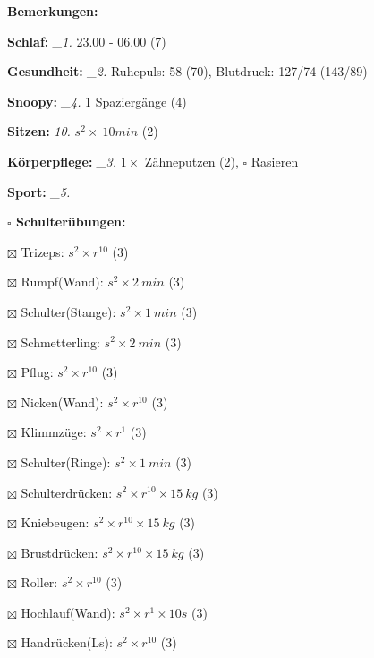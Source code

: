 \documentclass[10pt,a4paper]{article}
\newcommand\prop[1] {{\color {alizarin} {\bf #1}}}             %
\newcommand\mand[1] {{\color {burntorange} {\bf #1}}}          %
\newcommand\topspace{\vskip -15pt \hskip 20pt}
\newcommand\n[1] { {\sl #1.} \hskip 5pt }
\begin{document}
\begin{mdframed}[style=daystyle]
  \begin{labeling}{{\mand {Bemerkungen:}}}
    \setlength\itemsep{-3pt}
  \item[{\mand {Schlaf:}}]        \n{\_1} 23.00 - 06.00 (7)
  \item[{\mand {Gesundheit:}}]    \n{\_2} Ruhepuls: 58 (70), Blutdruck: 127/74 (143/89)
  \item[{\mand {Snoopy:}}]        \n{\_4} 1 Spaziergänge (4)  
  \item[{\mand {Sitzen:}}]         \n{10} $s^2 \times\ 10 min$ (2)
  \item[{\mand {Körperpflege:}}]  \n{\_3} $1 \times$ Zähneputzen (2), $\square$ Rasieren
  \item[{\mand {Sport:}}]         \n{\_5}
    \topspace
    \begin{minipage}{0.75\textwidth}  
      \begin{labeling}{\prop {$\square$ {Schulterübungen:}}} 
        \setlength\itemsep{-3pt}
      \item[$\boxtimes$ Trizeps:]          $s^2 \times r^{10}$ (3)
      \item[$\boxtimes$ Rumpf(Wand):]      $s^2 \times 2\ min$ (3)
      \item[$\boxtimes$ Schulter(Stange):] $s^2 \times 1\ min$ (3)
      \item[$\boxtimes$ Schmetterling:]    $s^2 \times 2\ min$ (3)
      \item[$\boxtimes$ Pflug:]            $s^2 \times r^{10}$ (3)
      \item[$\boxtimes$ Nicken(Wand):]     $s^2 \times r^{10}$ (3)
      \item[$\boxtimes$ Klimmzüge:]        $s^2 \times r^1$ (3)
      \item[$\boxtimes$ Schulter(Ringe):]  $s^2 \times 1\ min$ (3)
      \item[$\boxtimes$ Schulterdrücken:]  $s^2 \times r^{10} \times 15\ kg$ (3)
      \item[$\boxtimes$ Kniebeugen:]       $s^2 \times r^{10} \times 15\ kg$ (3)
      \item[$\boxtimes$ Brustdrücken:]     $s^2 \times r^{10} \times 15\ kg$ (3)
      \item[$\boxtimes$ Roller:]           $s^2 \times r^{10}$ (3)
      \item[$\boxtimes$ Hochlauf(Wand):]   $s^2 \times r^{1} \times 10s$ (3)
      \item[$\boxtimes$ Handrücken(Ls):]   $s^2 \times r^{10}$ (3)

\end{labeling}
\end{minipage}
\end{labeling}
\end{mdframed}
\end{document}
